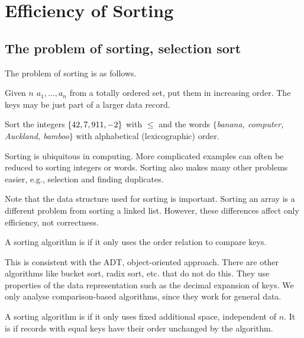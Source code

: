 \part{Efficiency of Sorting}  
\label{ch:effsort}

\chapter{The problem of sorting, selection sort} %
\label{sec:sortingproblem}
The problem of sorting is as follows. 
\begin{Definition}
Given $n$  $a_1, \dots , a_n$ from a totally ordered set, put them in increasing order. 
The keys may be just part of a larger data record.
\end{Definition}
\begin{Boxample}[2]
Sort the integers $\mbox{$\{42, 7, 911, -2\}$}$ with $\leq$ 
and the words $\{$\textit{banana, computer, Auckland, bamboo}$\}$ with  alphabetical (lexicographic) order.
\end{Boxample}

Sorting is ubiquitous in computing. More complicated examples can often be reduced to sorting integers or words.
Sorting also makes many other problems easier, e.g., selection and finding duplicates.

Note that the data structure used for sorting is important. 
Sorting an array is a different problem from sorting a linked list. 
However, these differences affect  only efficiency, not correctness.  

\begin{Definition}
A sorting algorithm is  if it only uses the order relation to compare keys.
\end{Definition}

This is consistent with the ADT, object-oriented approach. 
There are other algorithms like bucket sort, radix sort, etc. that do not do this. 
They use properties of the data representation such as the decimal expansion of keys.
We only analyse comparison-based algorithms, since they work for general data.


\begin{Definition}
A sorting algorithm is  if it only uses fixed additional space, independent of $n$.
It is  if records with equal keys have their order unchanged by the algorithm.
\end{Definition}

